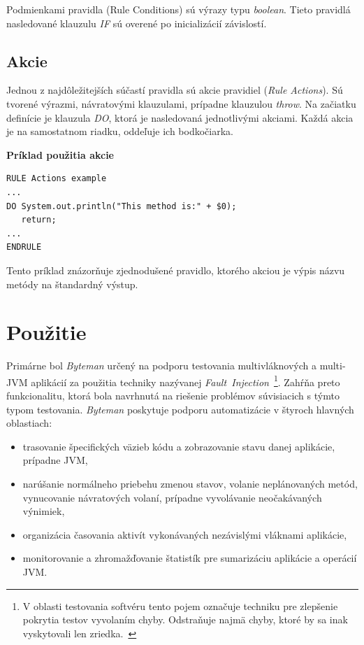 \documentclass[11pt,final,oneside]{fithesis}
\newenvironment{example}[1]
{
\vspace{3mm}
\noindent\textbf{#1}
\vspace{2mm}
}
{
\vspace{3mm}
}
\begin{document}
Podmienkami pravidla (Rule Conditions) sú výrazy typu \textit{boolean}.
Tieto pravidlá nasledované klauzulu \textit{IF} sú overené po inicializácií 
závislostí.

\subsection{Akcie}
Jednou z najdôležitejších súčastí pravidla sú akcie pravidiel (\textit{Rule 
Actions}). Sú tvorené výrazmi, návratovými klauzulami, prípadne klauzulou
\textit{throw}. Na začiatku definície je klauzula \textit{DO}, ktorá je 
nasledovaná jednotlivými akciami. Každá akcia je na samostatnom riadku, 
oddeľuje ich bodkočiarka.

\begin{example}{Príklad použitia akcie}
\begin{verbatim}
RULE Actions example
...
DO System.out.println("This method is:" + $0);
   return;
...
ENDRULE
\end{verbatim}
\end{example}

Tento príklad znázorňuje zjednodušené pravidlo, ktorého akciou je výpis názvu 
metódy na štandardný výstup. 

\section{Použitie}
Primárne bol \textit{Byteman} určený na podporu testovania multivláknových a
multi-JVM aplikácií za použitia techniky nazývanej
\textit{Fault~Injection}~\footnote{V oblasti testovania softvéru tento pojem 
označuje techniku pre zlepšenie pokrytia testov vyvolaním chyby. Odstraňuje 
najmä chyby, ktoré by sa inak vyskytovali len
zriedka.~\cite{Roebuck:2011:STH:2031364}}. Zahŕňa preto 
funkcionalitu, ktorá bola navrhnutá na riešenie problémov súvisiacich s týmto 
typom testovania. \textit{Byteman} poskytuje podporu automatizácie v 
štyroch hlavných 
oblastiach:

\begin{itemize}
\item trasovanie špecifických väzieb kódu a zobrazovanie stavu danej
aplikácie, prípadne JVM,
\item narúšanie normálneho priebehu zmenou stavov, volanie neplánovaných
metód, vynucovanie návratových volaní, prípadne vyvolávanie neočakávaných 
výnimiek,
\item organizácia časovania aktivít vykonávaných nezávislými vláknami 
aplikácie,
\item monitorovanie a zhromažďovanie štatistík pre sumarizáciu aplikácie a
operácií JVM.
\end{itemize}
\end{document}
